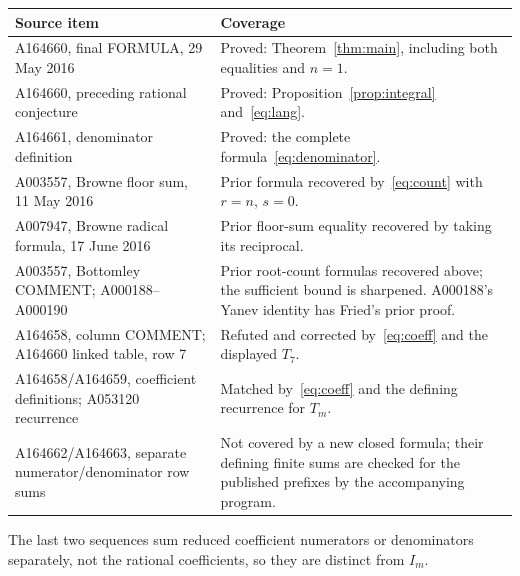 \documentclass[11pt]{article}
\begin{document}
\begin{center}
\small
\begin{tabular}{@{}p{}p{}@{}}
\toprule
Source item & Coverage \\
\midrule
A164660, final FORMULA, 29 May 2016 &
Proved: Theorem~\ref{thm:main}, including both equalities and $n=1$.\\
A164660, preceding rational conjecture &
Proved: Proposition~\ref{prop:integral} and~\eqref{eq:lang}.\\
A164661, denominator definition &
Proved: the complete formula~\eqref{eq:denominator}.\\
A003557, Browne floor sum, 11 May 2016 &
Prior formula recovered by~\eqref{eq:count} with $r=n$, $s=0$.\\
A007947, Browne radical formula, 17 June 2016 &
Prior floor-sum equality recovered by taking its reciprocal.\\
A003557, Bottomley COMMENT; A000188--A000190 &
Prior root-count formulas recovered above; the sufficient bound is
sharpened. A000188's Yanev identity has Fried's prior proof.\\
A164658, column COMMENT; A164660 linked table, row 7 &
Refuted and corrected by~\eqref{eq:coeff} and the displayed $T_7$.\\
A164658/A164659, coefficient definitions; A053120 recurrence &
Matched by~\eqref{eq:coeff} and the defining recurrence for $T_m$.\\
A164662/A164663, separate numerator/denominator row sums
\cite{oeis662,oeis663} &
Not covered by a new closed formula; their defining finite sums are
checked for the published prefixes by the accompanying program.\\
\bottomrule
\end{tabular}
\end{center}
The last two sequences sum reduced coefficient numerators or denominators
separately, not the rational coefficients, so they are distinct from $I_m$.
\end{document}
